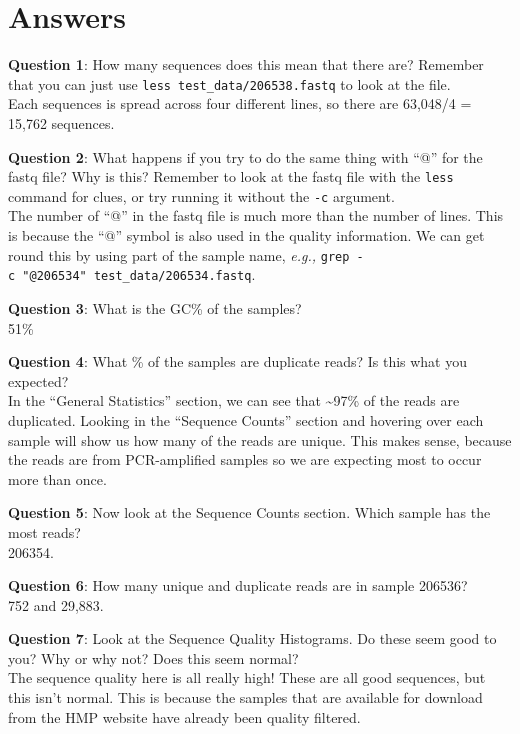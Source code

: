 \documentclass[
]{book}
\begin{document}
\section{Answers}\label{answers}

\textbf{Question 1}: How many sequences does this mean that there are? Remember that you can just use \texttt{less\ test\_data/206538.fastq} to look at the file.\\
Each sequences is spread across four different lines, so there are 63,048/4 = 15,762 sequences.

\textbf{Question 2}: What happens if you try to do the same thing with ``@'' for the fastq file? Why is this? Remember to look at the fastq file with the \texttt{less} command for clues, or try running it without the \texttt{-c} argument.\\
The number of ``@'' in the fastq file is much more than the number of lines. This is because the ``@'' symbol is also used in the quality information. We can get round this by using part of the sample name, \emph{e.g.,} \texttt{grep\ -c\ "@206534"\ test\_data/206534.fastq}.

\textbf{Question 3}: What is the GC\% of the samples?\\
51\%

\textbf{Question 4}: What \% of the samples are duplicate reads? Is this what you expected?\\
In the ``General Statistics'' section, we can see that \textasciitilde97\% of the reads are duplicated. Looking in the ``Sequence Counts'' section and hovering over each sample will show us how many of the reads are unique. This makes sense, because the reads are from PCR-amplified samples so we are expecting most to occur more than once.

\textbf{Question 5}: Now look at the Sequence Counts section. Which sample has the most reads?\\
206354.

\textbf{Question 6}: How many unique and duplicate reads are in sample 206536?\\
752 and 29,883.

\textbf{Question 7}: Look at the Sequence Quality Histograms. Do these seem good to you? Why or why not? Does this seem normal?\\
The sequence quality here is all really high! These are all good sequences, but this isn't normal. This is because the samples that are available for download from the HMP website have already been quality filtered.
\end{document}
